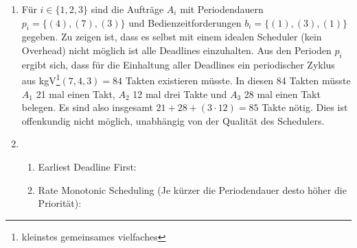 \documentclass[ngerman]{fbi-aufgabenblatt}
\begin{document}
\begin{enumerate}
	\item Für $i \in \{1,2,3\}$ sind die Aufträge $A_i$ mit Periodendauern $p_i = \{(4),(7),(3)\}$ und Bedienzeitforderungen $b_i = \{(1),(3),(1)\}$ gegeben. 
	Zu zeigen ist, dass es selbst mit einem idealen Scheduler (kein Overhead) nicht möglich ist alle Deadlines einzuhalten.
	Aus den Perioden $p_i$ ergibt sich, dass für die Einhaltung aller Deadlines ein periodischer Zyklus aus
	kgV\footnote{kleinstes gemeinsames vielfaches}$(7,4,3) = 84$ Takten existieren müsste. In diesen 84 Takten müsste
	$A_1$ 21 mal einen Takt, $A_2$ 12 mal drei Takte und $A_3$ 28 mal einen Takt belegen. Es sind also
	insgesamt $21 + 28 + (3\cdot 12) = 85$ Takte nötig. Dies ist offenkundig nicht möglich, unabhängig von der Qualität des Schedulers.
	\item
	\begin{enumerate}
	
	\item Earliest Deadline First:\\
	\begin{blockgraph}{28}{1}{0.4}

	
	\end{blockgraph}

 \newpage
 
	\item Rate Monotonic Scheduling (Je kürzer die Periodendauer desto höher die Priorität):\\
	\begin{blockgraph}{26}{1}{0.4}


\end{blockgraph}
\end{enumerate}
\end{enumerate}
\end{document}
